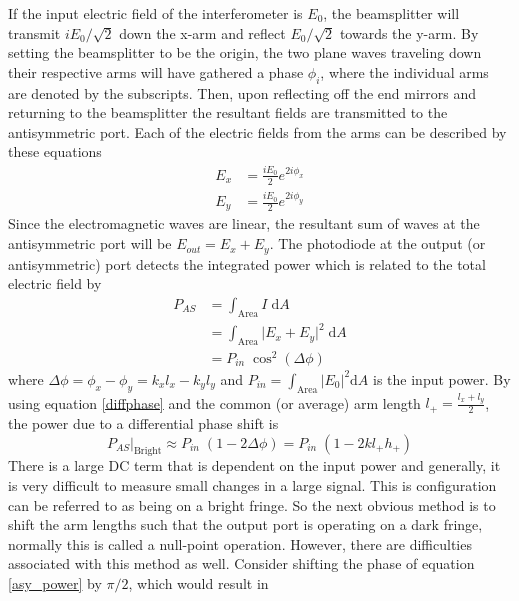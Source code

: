 		If the input electric field of the interferometer is $E_0$, the beamsplitter will transmit $iE_0 /\sqrt{2}$ down the x-arm and reflect $E_0 /\sqrt{2}$ towards the y-arm.  By setting the beamsplitter to be the origin, the two plane waves traveling down their respective arms will have gathered a phase $\phi_i$, where the individual arms are denoted by the subscripts. Then, upon reflecting off the end mirrors and returning to the beamsplitter the resultant fields are transmitted to the antisymmetric port. Each of the electric fields from the arms can be described by these equations
			\begin{equation}
			\begin{aligned}
				E_{x} 	&=	\frac{i E_0}{2} e^{2i\phi_{x}}	
			\\	E_{y} 	&=	\frac{i E_0}{2} e^{2i\phi_{y}}
			\end{aligned}
			\end{equation}
		Since the electromagnetic waves are linear, the resultant sum of waves at the antisymmetric port will be $E_{out} = E_x + E_y$. The photodiode at the output (or antisymmetric) port detects the integrated power which is related to the total electric field by
			\begin{equation}
			\begin{aligned}\label{asy_power}
				P_{AS}	&= \int_{\text{Area}} I \;				\text{d}A 
			\\			&= \int_{\text{Area}} \vert E_x + E_y \vert^2 \;	\text{d}A 
			\\			&= P_{in} \; \cos^2(\Delta \phi)
			\end{aligned}
			\end{equation}	
		where $\Delta \phi = \phi_{x} - \phi_{y} = k_x l_x - k_y l_y$ and $P_{in} = \int_{\text{Area}}	 \vert E_0\vert^2 \text{d}A$ is the input power. By using equation \ref{diffphase} and the common (or average) arm length $l_{+} = \frac{l_x + l_y}{2}$, the power due to a differential phase shift is
			\begin{equation}
			P_{AS}\vert_{\text{Bright}} \approx P_{in} \; (1-2 \Delta \phi) = P_{in} \; (1-2 k l_{+} h_{+})
			\end{equation}
		There is a large DC term that is dependent on the input power and generally, it is very difficult to measure small changes in a large signal.  This is configuration can be referred to as being on a bright fringe. So the next obvious method is to shift the arm lengths such that the output port is operating on a dark fringe, normally this is called a null-point operation.  However, there are difficulties associated with this method as well. Consider shifting the phase of equation \ref{asy_power} by $\pi/2$, which would result in
